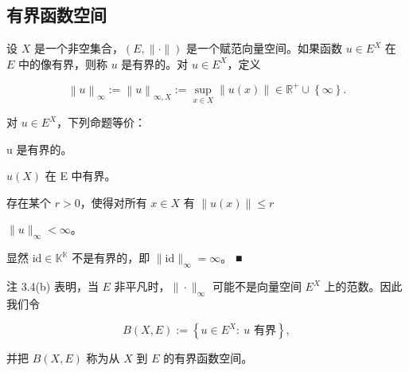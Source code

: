 \subsection*{有界函数空间}

设 $X$ 是一个非空集合，$(E, \|\cdot\|)$ 是一个赋范向量空间。如果函数 $u \in E^X$ 在 $E$ 中的像有界，则称 $u$ 是$\text{有界的}$。对 $u \in E^X$，定义

\begin{equation}
\left\|u\right\|_{\infty}:=\left\|u\right\|_{\infty,X}:=\sup_{x\in X}\left\|u(x)\right\|\in\mathbb{R}^{+}\cup\left\{\infty\right\}.
\end{equation}

\begin{remark}

\begin{items}
\item

对 $ u \in E^X $，下列命题等价：

\begin{subitems}
\item

u 是有界的。

\item

$ u(X) $ 在 E 中有界。

\item

存在某个 $ r > 0 $，使得对所有 $ x \in X $ 有 $ \|u(x)\| \leq r $

\item

$ \|u\|_{\infty} < \infty $。

\end{subitems}

\item

显然 $ \mathrm{id} \in \mathbb{K}^{\mathbb{K}} $ 不是有界的，即 $ \|\mathrm{id}\|_{\infty} = \infty $。 ■

\end{items}

注 3.4(b) 表明，当 $ E $ 非平凡时，$ \|\cdot\|_\infty $ 可能不是向量空间 $ E^X $ 上的范数。因此我们令

\[
B(X,E):=\left\{u\in E^{X}:~u\text{ 有界}\right\},
\]

并把 $B(X,E)$ 称为从 $X$ 到 $E$ 的有界函数空间。

\end{remark}

